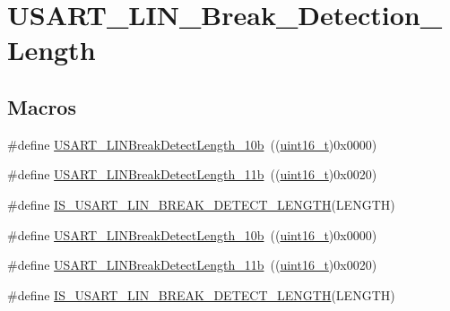 \hypertarget{group___u_s_a_r_t___l_i_n___break___detection___length}{}\section{U\+S\+A\+R\+T\+\_\+\+L\+I\+N\+\_\+\+Break\+\_\+\+Detection\+\_\+\+Length}
\label{group___u_s_a_r_t___l_i_n___break___detection___length}
\subsection*{Macros}
\begin{DoxyCompactItemize}
\item 
\#define \hyperlink{group___u_s_a_r_t___l_i_n___break___detection___length_gacfd0aabae8774239440e828c961ac2a0}{U\+S\+A\+R\+T\+\_\+\+L\+I\+N\+Break\+Detect\+Length\+\_\+10b}~((\hyperlink{_p_e___types_8h_a1f1825b69244eb3ad2c7165ddc99c956}{uint16\+\_\+t})0x0000)
\item 
\#define \hyperlink{group___u_s_a_r_t___l_i_n___break___detection___length_gaf591cfcc859d67d71e6fa594eb5aec16}{U\+S\+A\+R\+T\+\_\+\+L\+I\+N\+Break\+Detect\+Length\+\_\+11b}~((\hyperlink{_p_e___types_8h_a1f1825b69244eb3ad2c7165ddc99c956}{uint16\+\_\+t})0x0020)
\item 
\#define \hyperlink{group___u_s_a_r_t___l_i_n___break___detection___length_gaa7a45d542b1df5da1160777ad4a80d72}{I\+S\+\_\+\+U\+S\+A\+R\+T\+\_\+\+L\+I\+N\+\_\+\+B\+R\+E\+A\+K\+\_\+\+D\+E\+T\+E\+C\+T\+\_\+\+L\+E\+N\+G\+TH}(L\+E\+N\+G\+TH)
\item 
\#define \hyperlink{group___u_s_a_r_t___l_i_n___break___detection___length_gacfd0aabae8774239440e828c961ac2a0}{U\+S\+A\+R\+T\+\_\+\+L\+I\+N\+Break\+Detect\+Length\+\_\+10b}~((\hyperlink{_p_e___types_8h_a1f1825b69244eb3ad2c7165ddc99c956}{uint16\+\_\+t})0x0000)
\item 
\#define \hyperlink{group___u_s_a_r_t___l_i_n___break___detection___length_gaf591cfcc859d67d71e6fa594eb5aec16}{U\+S\+A\+R\+T\+\_\+\+L\+I\+N\+Break\+Detect\+Length\+\_\+11b}~((\hyperlink{_p_e___types_8h_a1f1825b69244eb3ad2c7165ddc99c956}{uint16\+\_\+t})0x0020)
\item 
\#define \hyperlink{group___u_s_a_r_t___l_i_n___break___detection___length_gaa7a45d542b1df5da1160777ad4a80d72}{I\+S\+\_\+\+U\+S\+A\+R\+T\+\_\+\+L\+I\+N\+\_\+\+B\+R\+E\+A\+K\+\_\+\+D\+E\+T\+E\+C\+T\+\_\+\+L\+E\+N\+G\+TH}(L\+E\+N\+G\+TH)
\end{DoxyCompactItemize}


